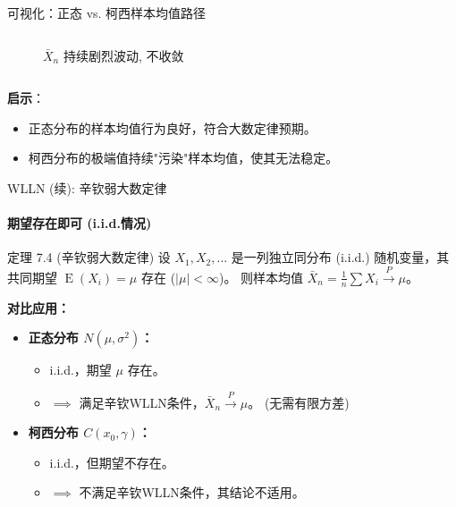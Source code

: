 \documentclass[UTF8]{beamer}
\DeclareMathOperator{\E}{\operatorname{E}}
\begin{document}
\begin{frame}[shrink=10]{可视化：正态 vs. 柯西样本均值路径}
\begin{columns}[T]
\begin{column}{0.5\textwidth}
\begin{figure}
                \caption{$\bar{X}_n$ 持续剧烈波动, \alert{不收敛}}
            \end{figure}
        \end{column}
    \end{columns}
    \textbf{启示}：
    \begin{itemize}
        \item 正态分布的样本均值行为良好，符合大数定律预期。
        \item 柯西分布的极端值持续"污染"样本均值，使其无法稳定。
    \end{itemize}
\end{frame}

\begin{frame}[shrink=10]{WLLN (续): 辛钦弱大数定律}
    \framesubtitle{期望存在即可 (i.i.d.情况)}
    \begin{block}{定理 7.4 (辛钦弱大数定律)}
        设 $X_1, X_2, \dots$ 是一列\alert{独立同分布 (i.i.d.)} 随机变量，其共同期望 $\E(X_i) = \mu$ \alert{存在} ($|\mu| < \infty$)。
        则样本均值 $\bar{X}_n = \frac{1}{n} \sum X_i \xrightarrow{P} \mu$。
    \end{block}
    \pause
    \textbf{对比应用：}
    \begin{itemize}
        \item \textbf{正态分布 $N(\mu, \sigma^2)$：}
            \begin{itemize}
                \item i.i.d.，期望 $\mu$ \alert{存在}。
                \item $\implies$ 满足辛钦WLLN条件，$\bar{X}_n \xrightarrow{P} \mu$。 (无需有限方差)
            \end{itemize}
        \item \textbf{柯西分布 $C(x_0, \gamma)$：}
            \begin{itemize}
                \item i.i.d.，但期望\alert{不存在}。
                \item $\implies$ \alert{不满足}辛钦WLLN条件，其结论不适用。
            \end{itemize}
    \end{itemize}
\end{frame}
\end{document}
